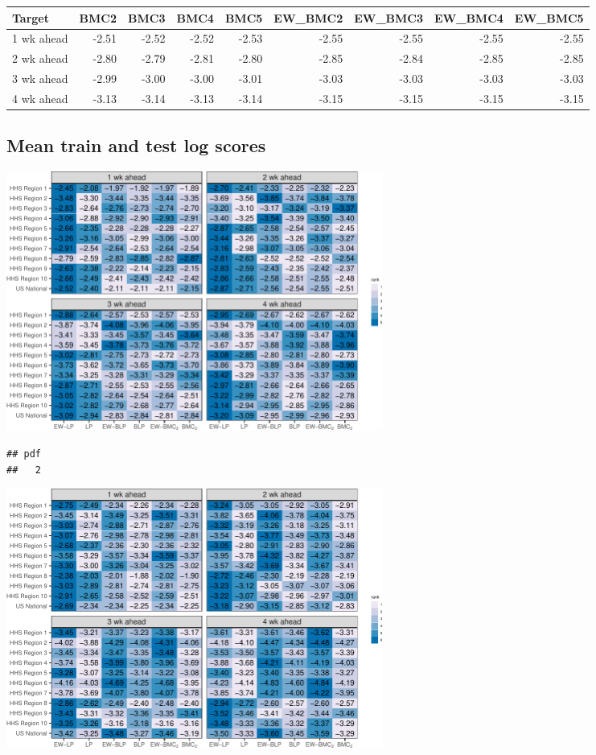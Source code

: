 \documentclass[
]{article}
\begin{document}
\begin{tabular}{l|r|r|r|r|r|r|r|r}
\hline
Target & BMC2 & BMC3 & BMC4 & BMC5 & EW\_BMC2 & EW\_BMC3 & EW\_BMC4 & EW\_BMC5\\
\hline
1 wk ahead & -2.51 & -2.52 & -2.52 & -2.53 & -2.55 & -2.55 & -2.55 & -2.55\\
\hline
2 wk ahead & -2.80 & -2.79 & -2.81 & -2.80 & -2.85 & -2.84 & -2.85 & -2.85\\
\hline
3 wk ahead & -2.99 & -3.00 & -3.00 & -3.01 & -3.03 & -3.03 & -3.03 & -3.03\\
\hline
4 wk ahead & -3.13 & -3.14 & -3.13 & -3.14 & -3.15 & -3.15 & -3.15 & -3.15\\
\hline
\end{tabular}

\newpage

\hypertarget{mean-train-and-test-log-scores}{%
\subsection{Mean train and test log
scores}\label{mean-train-and-test-log-scores}}

\includegraphics[width=468px]{plot_calibration_files/figure-latex/lsheatloc1-1}

\begin{verbatim}
## pdf 
##   2
\end{verbatim}

\includegraphics[width=468px]{plot_calibration_files/figure-latex/lsheatloc2-1}
\end{document}
